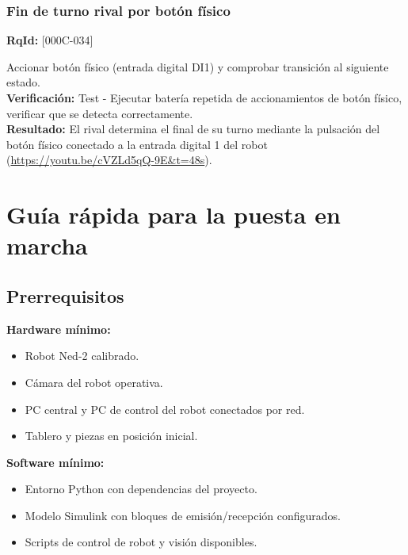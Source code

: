 \documentclass[12pt,a4paper]{article}
\begin{document}
\subsubsection{Fin de turno rival por botón físico}
\textbf{RqId:} [000C-034]
\vspace{0.3em}
\par Accionar botón físico (entrada digital DI1) y comprobar transición al siguiente estado.
\\ \textbf{Verificación:} Test - Ejecutar batería repetida de accionamientos de botón físico, verificar que se detecta correctamente.
\\ \textbf{Resultado:} El rival determina el final de su turno mediante la pulsación del botón físico conectado a la entrada digital 1 del robot (\url{https://youtu.be/cVZLd5qQ-9E&t=48s}).

\section{Guía rápida para la puesta en marcha}

\subsection{Prerrequisitos}
\textbf{Hardware mínimo:}
\begin{itemize}
  \item Robot Ned-2 calibrado.
  \item Cámara del robot operativa.
  \item PC central y PC de control del robot conectados por red.
  \item Tablero y piezas en posición inicial.
\end{itemize}

\textbf{Software mínimo:}
\begin{itemize}
  \item Entorno Python con dependencias del proyecto.
  \item Modelo Simulink con bloques de emisión/recepción configurados.
  \item Scripts de control de robot y visión disponibles.
\end{itemize}
\end{document}
